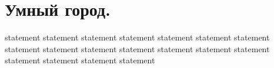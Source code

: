 \chapter{Умный город.}

{statement}
{statement}
{statement}
{statement}
{statement}
{statement}
{statement}
{statement}
{statement}
{statement}
{statement}
{statement}
{statement}
{statement}
{statement}
{statement}
{statement}
{statement}
